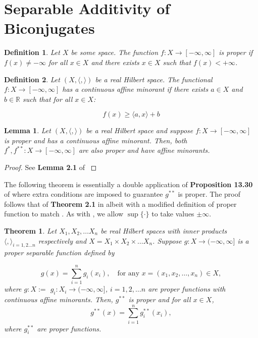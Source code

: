 \documentclass[11pt]{article}
\newtheorem{definition}{Definition}
\newtheorem{theorem}{Theorem}
\newtheorem{lemma}{Lemma}
\newcommand{\R}{\mathbb{R}}
\begin{document}
	\section{Separable Additivity of Biconjugates}
	
	\begin{definition}
		Let $X$ be some space. The function $f:X\to[-\infty, \infty]$ is proper if $f(x)\neq -\infty$ for all $x\in X$ and there exists $x\in X$ such that $f(x) < +\infty$.
		\end{definition}
	\begin{definition}
		Let $(X,\langle, \rangle)$ be a real Hilbert space. The functional $f:X\to[-\infty,\infty]$ has a continuous affine minorant if there exists $a\in X$ and $b\in\R$ such that for all $x\in X$:
		
		\[	f(x)\geq \langle a, x \rangle + b
				\]
		\end{definition}
	
	\begin{lemma}
		\label{lem:proper_affine}
		Let $(X,\langle, \rangle)$ be a real Hilbert space and suppose $f:X\to[-\infty, \infty]$ is proper and has a continuous affine minorant. Then, both $f^{*}, f^{**}:X\to[-\infty, \infty]$ are also proper and have affine minorants.
		\end{lemma}
	
		\begin{proof}
			See \textbf{Lemma 2.1} of \cite{Klein}
			\end{proof}
	
	\noindent The following theorem is essentially a double application of \textbf{Proposition 13.30} of \cite{Bauschke2010} where extra conditions are imposed to guarantee $g^{**}$ is proper. The proof follows that of \textbf{Theorem 2.1} in \cite{Klein} albeit with a modified definition of proper function to match \cite{Bauschke2010}. As with \cite{Bauschke2010}, we allow $\sup\{\cdot\}$ to take values $\pm\infty$. 
	
	
	\begin{theorem}
		Let $X_{1}, X_{2}, \ldots X_{n}$ be real Hilbert spaces with inner products $\langle ,\rangle_{i=1,2\ldots n}$ respectively and $X = X_{1}\times X_{2}\times \ldots X_{n}$.
		Suppose $g:X\to(-\infty,\infty]$ is a proper separable function defined by
		
		\[	g(x) = \sum_{i=1}^{n}g_{i}(x_i), \quad\text{for any }x=(x_1, x_2, \ldots, x_n)\in X,
		\]
		where  $g:X:=$ $g_{i}:X_{i}\to(-\infty, \infty]$, $i=1,2,\ldots n$ are proper functions with continuous affine minorants. Then, $g^{**}$ is proper and for all $x\in X$,
		\[	g^{**}(x) = \sum_{i=1}^{n} g_{i}^{**}(x_i),
		\]
		where $g^{**}_{i}$ are proper functions.
		\end{theorem}
		
\end{document}
